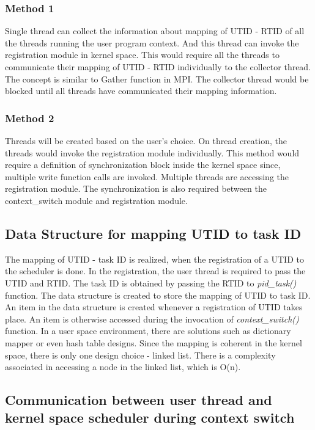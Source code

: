 \subsubsection{Method 1}

Single thread can collect the information about mapping of UTID - RTID of all the threads running the user program context. 
And this thread can invoke the registration module in kernel space. 
This would require all the threads to communicate their mapping of UTID - RTID individually to the collector thread. 
The concept is similar to Gather function in MPI. 
The collector thread would be blocked until all threads have communicated their mapping information. 

\subsubsection{Method 2}

Threads will be created based on the user's choice. 
On thread creation, the threads would invoke the registration module individually. 
This method would require a definition of synchronization block inside the kernel space since, multiple write function calls are invoked. 
Multiple threads are accessing the registration module. 
The synchronization is also required between the context\_switch module and registration module.


\subsection{Data Structure for mapping UTID to task ID}

The mapping of UTID - task ID is realized, when the registration of a UTID to the scheduler is done. 
In the registration, the user thread is required to pass the UTID and RTID. 
The task ID is obtained by passing the RTID to \emph{pid\_task()} function. 
The data structure is created to store the mapping of UTID to task ID. 
An item in the data structure is created whenever a registration of UTID takes place. 
An item is otherwise accessed during the invocation of \emph{context\_switch()} function. 
In a user space environment, there are solutions such as dictionary mapper or even hash table designs. 
Since the mapping is coherent in the kernel space, there is only one design choice - linked list. 
There is a complexity associated in accessing a node in the linked list, which is O(n).

\subsection{Communication between user thread and kernel space scheduler during context switch} 

